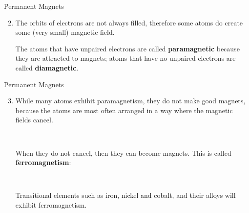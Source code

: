 \documentclass[12pt,aspectratio=169]{beamer}
\begin{document}
\begin{frame}{Permanent Magnets}
  \begin{enumerate}
    \setcounter{enumi}{1}
  \item The orbits of electrons are not always filled, therefore some atoms do
    create some (very small) magnetic field.
    \begin{center}
    \end{center}
    The atoms that have unpaired electrons are called \textbf{paramagnetic}
    because they are attracted to magnets; atoms that have no unpaired
    electrons are called \textbf{diamagnetic}.
  \end{enumerate}
\end{frame}



\begin{frame}{Permanent Magnets}
  \begin{enumerate}
    \setcounter{enumi}{2}
  \item While many atoms exhibit paramagnetism, they do not make good magnets,
    because the atoms are most often arranged in a way where the magnetic fields
    cancel.%
    \begin{center}
      \\
    \end{center}
    When they do not cancel, then they can become magnets. This is called
    \textbf{ferromagnetism}:
    \begin{center}
      \\
    \end{center}
    Transitional elements such as iron, nickel and cobalt, and their alloys
    will exhibit ferromagnetism.
  \end{enumerate}
\end{frame}
\end{document}
